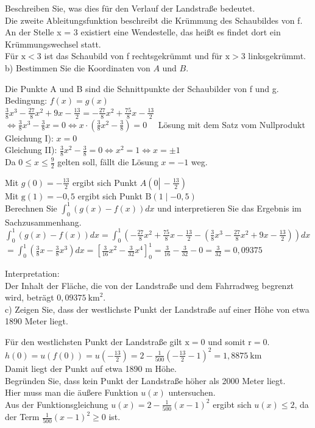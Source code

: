 \documentclass[10pt]{article}
\begin{document}
Beschreiben Sie, was dies für den Verlauf der Landstraße bedeutet.\\
Die zweite Ableitungsfunktion beschreibt die Krümmung des Schaubildes von f. An der Stelle x = 3 existiert eine Wendestelle, das heißt es findet dort ein Krümmungswechsel statt.\\
Für $\mathrm{x}<3$ ist das Schaubild von f rechtsgekrümmt und für $\mathrm{x}>3$ linksgekrümmt.\\
b) Bestimmen Sie die Koordinaten von $A$ und $B$.

Die Punkte A und B sind die Schnittpunkte der Schaubilder von f und g.\\
Bedingung: $f(x)=g(x)$\\
$\frac{3}{8} x^{3}-\frac{27}{8} x^{2}+9 x-\frac{13}{2}=-\frac{27}{8} x^{2}+\frac{75}{8} x-\frac{13}{2}$\\
$\Leftrightarrow \frac{3}{8} x^{3}-\frac{3}{8} x=0 \Leftrightarrow x \cdot\left(\frac{3}{8} x^{2}-\frac{3}{8}\right)=0 \quad$ Lösung mit dem Satz vom Nullprodukt\\
Gleichung I): $x=0$\\
Gleichung II): $\frac{3}{8} x^{2}-\frac{3}{8}=0 \Leftrightarrow x^{2}=1 \Leftrightarrow x= \pm 1$\\
Da $0 \leq x \leq \frac{9}{2}$ gelten soll, fällt die Lösung $x=-1$ weg.

Mit $g(0)=-\frac{13}{2}$ ergibt sich Punkt $A\left(0 \left\lvert\,-\frac{13}{2}\right.\right)$\\
Mit $\mathrm{g}(1)=-0,5$ ergibt sich Punkt $\mathrm{B}(1 \mid-0,5)$\\
Berechnen Sie $\int_{0}^{1}(g(x)-f(x)) d x$ und interpretieren Sie das Ergebnis im Sachzusammenhang.\\
$\int_{0}^{1}(g(x)-f(x)) d x=\int_{0}^{1}\left(-\frac{27}{8} x^{2}+\frac{75}{8} x-\frac{13}{2}-\left(\frac{3}{8} x^{3}-\frac{27}{8} x^{2}+9 x-\frac{13}{2}\right)\right) d x$ $=\int_{0}^{1}\left(\frac{3}{8} x-\frac{3}{8} x^{3}\right) d x=\left[\frac{3}{16} x^{2}-\frac{3}{32} x^{4}\right]_{0}^{1}=\frac{3}{16}-\frac{3}{32}-0=\frac{3}{32}=0,09375$

Interpretation:\\
Der Inhalt der Fläche, die von der Landstraße und dem Fahrradweg begrenzt wird, beträgt $0,09375 \mathrm{~km}^{2}$.\\
c) Zeigen Sie, dass der westlichste Punkt der Landstraße auf einer Höhe von etwa 1890 Meter liegt.

Für den westlichsten Punkt der Landstraße gilt $\mathrm{x}=0$ und somit $\mathrm{r}=0$.\\
$h(0)=u(f(0))=u\left(-\frac{13}{2}\right)=2-\frac{1}{500}\left(-\frac{13}{2}-1\right)^{2}=1,8875 \mathrm{~km}$\\
Damit liegt der Punkt auf etwa 1890 m Höhe.\\
Begründen Sie, dass kein Punkt der Landstraße höher als 2000 Meter liegt.\\
Hier muss man die äußere Funktion $u(x)$ untersuchen.\\
Aus der Funktionsgleichung $u(x)=2-\frac{1}{500}(x-1)^{2}$ ergibt sich $u(x) \leq 2$, da der Term $\frac{1}{500}(x-1)^{2} \geq 0$ ist.
\end{document}
